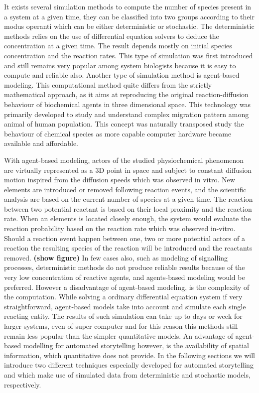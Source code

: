 It exists several simulation methods to compute the number of species present in a system at a given time, they can be classified into two groups according to their modus operanti which can be either deterministic or stochastic.
The deterministic methods relies on the use of differential equation solvers to deduce the concentration at a given time. 
The result depends mostly on initial species concentration and the reaction rates.
This type of simulation was first introduced and still remains very popular among system biologists because it is easy to compute and reliable also.
Another type of simulation method is agent-based modeling.
This computational method quite differs from the strictly mathematical approach, as it aims at reproducing the original reaction-diffusion behaviour of biochemical agents in three dimensional space.
This technology was primarily developed to study and understand complex migration pattern among animal of human population.
This concept was naturally transposed study the behaviour of chemical species as more capable computer hardware became available and affordable.

With agent-based modeling, actors of the studied physiochemical phenomenon are virtually represented as a 3D point in space and subject to constant diffusion motion inspired from the diffusion speeds which was observed in vitro.
New elements are introduced or removed following reaction events, and the scientific analysis are based on the current number of species at a given time.
The reaction between two potential reactant is based on their local proximity and the reaction rate.
When an elements is located closely enough, the system would evaluate the reaction probability based on the reaction rate which was observed in-vitro.
Should a reaction event happen between one, two or more potential actors of a reaction the resulting species of the reaction will be introduced and the reactants removed.
\textbf{(show figure)}
In few cases also, such as modeling of signalling processes, deterministic methods do not produce reliable results because of the very low concentration of reactive agents, and agents-based modeling would be preferred.
However a disadvantage of agent-based modeling, is the complexity of the computation.
While solving a ordinary differential equation system if very straightforward, agent-based models take into account and simulate each single reacting entity.
The results of such simulation can take up to days or week for larger systems, even of super computer and for this reason this methods still remain less popular than the simpler quantitative models.
An advantage of agent-based modelling for automated storytelling however, is the availability of spatial information, which quantitative does not provide.
In the following sections we will introduce two different techniques especially developed for automated storytelling and which make use of simulated data from deterministic and stochastic models, respectively.

